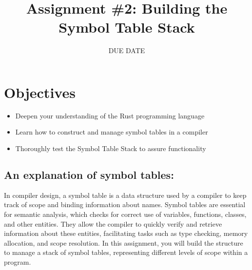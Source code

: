 \documentclass[
	12pt, %
]{fphw}
\title{Assignment \#2: Building the Symbol Table Stack} %
\date{DUE DATE} %
\institute{Union College} %
\begin{document}
\maketitle %


\section*{Objectives}

\begin{problem}
	\begin{itemize}
	    \item Deepen your understanding of the Rust programming language
        \item Learn how to construct and manage symbol tables in a compiler
        \item Thoroughly test the Symbol Table Stack to assure functionality
	\end{itemize}
\end{problem}


\subsection*{An explanation of symbol tables:}
In compiler design, a symbol table is a data structure used by a compiler to keep track of scope and binding information about names. Symbol tables are essential for semantic analysis, which checks for correct use of variables, functions, classes, and other entities. They allow the compiler to quickly verify and retrieve information about these entities, facilitating tasks such as type checking, memory allocation, and scope resolution. In this assignment, you will build the structure to manage a stack of symbol tables, representing different levels of scope within a program.
\end{document}

